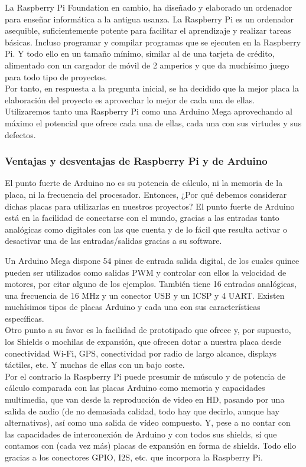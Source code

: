 La Raspberry Pi Foundation en cambio, ha diseñado y elaborado un ordenador para enseñar informática a la antigua usanza. La Raspberry Pi es un ordenador asequible, 
suficientemente potente para facilitar el aprendizaje y realizar tareas básicas. Incluso programar y compilar programas que se ejecuten en la Raspberry Pi. Y todo ello en un
tamaño mínimo, similar al de una tarjeta de crédito, alimentado con un cargador de móvil de 2 amperios y que da muchísimo juego para todo tipo de proyectos.\\

Por tanto, en respuesta a la pregunta inicial, se ha decidido que la mejor placa la elaboración del proyecto es aprovechar lo mejor de cada una de ellas. Utilizaremos tanto una Raspberry Pi
como una Arduino Mega aprovechando al máximo el potencial que ofrece cada una de ellas, cada una con sus virtudes y sus defectos.\\


\subsubsection{Ventajas y desventajas de Raspberry Pi y de Arduino}

El punto fuerte de Arduino no es su potencia de cálculo, ni la memoria de la placa, ni la frecuencia del procesador. Entonces, ¿Por qué debemos considerar dichas placas para
utilizarlas en nuestros proyectos? El punto fuerte de Arduino está en la facilidad de conectarse con el mundo, gracias a las entradas tanto analógicas como digitales con las que
cuenta y de lo fácil que resulta activar o desactivar una de las entradas/salidas gracias a su software.

Un Arduino Mega dispone 54 pines de entrada salida digital, de los cuales quince pueden ser utilizados como salidas PWM y controlar con ellos la velocidad de motores, por 
citar alguno de los ejemplos. También tiene 16 entradas analógicas, una frecuencia de 16 MHz y un conector USB y un ICSP y 4 UART. Existen muchísimos tipos de
placas Arduino y cada una con sus características específicas.\\

Otro punto a su favor es la facilidad de prototipado que ofrece y, por supuesto, los Shields o mochilas de expansión, que ofrecen dotar a nuestra placa desde conectividad Wi-Fi, 
GPS, conectividad por radio de largo alcance, displays táctiles, etc. Y muchas de ellas con un bajo coste.\\

Por el contrario la Raspberry Pi puede presumir de músculo y de potencia de cálculo comparada con las placas Arduino como memoria y capacidades multimedia, que van desde la 
reproducción de video en HD, pasando por una salida de audio (de no demasiada calidad, todo hay que decirlo, aunque hay alternativas), así como una salida de vídeo compuesto.
Y, pese a no contar con las capacidades de interconexión de Arduino y con todos sus shields, sí que contamos con (cada vez más) placas de expansión en forma de shields. 
Todo ello gracias a los conectores GPIO, I2S, etc. que incorpora la Raspberry Pi.\\

